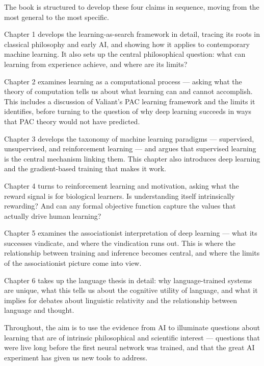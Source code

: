 \documentclass{drpaper}
\begin{document}
The book is structured to develop these four claims in sequence, moving from the most general to the most specific.

Chapter 1 develops the learning-as-search framework in detail, tracing its roots in classical philosophy and early AI, and showing how it applies to contemporary machine learning. It also sets up the central philosophical question: what can learning from experience achieve, and where are its limits?

Chapter 2 examines learning as a computational process — asking what the theory of computation tells us about what learning can and cannot accomplish. This includes a discussion of Valiant's PAC learning framework and the limits it identifies, before turning to the question of why deep learning succeeds in ways that PAC theory would not have predicted.

Chapter 3 develops the taxonomy of machine learning paradigms — supervised, unsupervised, and reinforcement learning — and argues that supervised learning is the central mechanism linking them. This chapter also introduces deep learning and the gradient-based training that makes it work.

Chapter 4 turns to reinforcement learning and motivation, asking what the reward signal is for biological learners. Is understanding itself intrinsically rewarding? And can any formal objective function capture the values that actually drive human learning?

Chapter 5 examines the associationist interpretation of deep learning — what its successes vindicate, and where the vindication runs out. This is where the relationship between training and inference becomes central, and where the limits of the associationist picture come into view.

Chapter 6 takes up the language thesis in detail: why language-trained systems are unique, what this tells us about the cognitive utility of language, and what it implies for debates about linguistic relativity and the relationship between language and thought.

Throughout, the aim is to use the evidence from AI to illuminate questions about learning that are of intrinsic philosophical and scientific interest — questions that were live long before the first neural network was trained, and that the great AI experiment has given us new tools to address.


\end{document}
